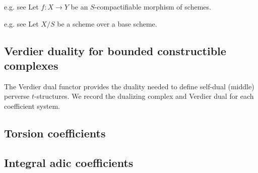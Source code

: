 




\begin{definition}{e.g. see \TODO{}}
    Let $f: X \to Y$ be an $S$-compactifiable morphism of schemes. 
\end{definition}


\begin{definition}{e.g. see \TODO{}}
    Let $X/S$ be a scheme over a base scheme.  
\end{definition}


\subsection{Verdier duality for bounded constructible complexes}

The Verdier dual functor provides the duality needed to define self-dual (middle) perverse $t$-structures. We record the dualizing complex and Verdier dual for each coefficient system.

\subsection{Torsion coefficients}




\subsection{Integral adic coefficients}




